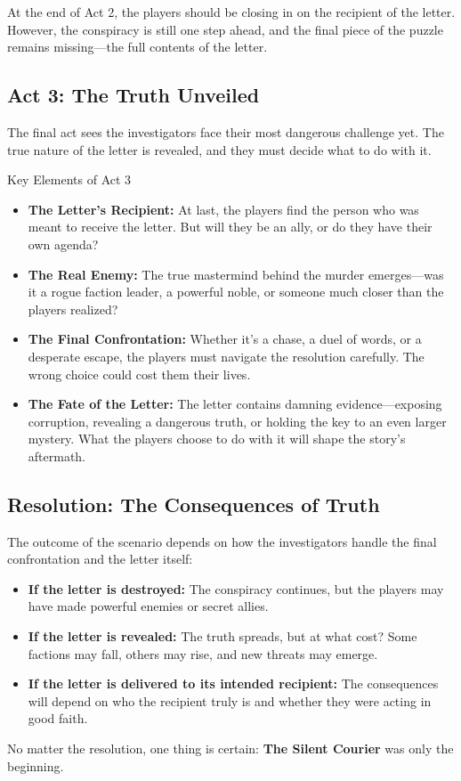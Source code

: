 \noindent
At the end of Act 2, the players should be closing in on the recipient of the letter. However, the conspiracy is still one step ahead, and the final piece of the puzzle remains missing—the full contents of the letter.

\subsection{Act 3: The Truth Unveiled}  
The final act sees the investigators face their most dangerous challenge yet. The true nature of the letter is revealed, and they must decide what to do with it.

\begin{Example}{Key Elements of Act 3}
    \begin{itemize}
        \item \textbf{The Letter’s Recipient:} At last, the players find the person who was meant to receive the letter. But will they be an ally, or do they have their own agenda?
        \item \textbf{The Real Enemy:} The true mastermind behind the murder emerges—was it a rogue faction leader, a powerful noble, or someone much closer than the players realized?
        \item \textbf{The Final Confrontation:} Whether it’s a chase, a duel of words, or a desperate escape, the players must navigate the resolution carefully. The wrong choice could cost them their lives.
        \item \textbf{The Fate of the Letter:} The letter contains damning evidence—exposing corruption, revealing a dangerous truth, or holding the key to an even larger mystery. What the players choose to do with it will shape the story’s aftermath.
    \end{itemize}
\end{Example}

\subsection{Resolution: The Consequences of Truth}  
The outcome of the scenario depends on how the investigators handle the final confrontation and the letter itself:

\begin{itemize}
    \item \textbf{If the letter is destroyed:} The conspiracy continues, but the players may have made powerful enemies or secret allies.
    \item \textbf{If the letter is revealed:} The truth spreads, but at what cost? Some factions may fall, others may rise, and new threats may emerge.
    \item \textbf{If the letter is delivered to its intended recipient:} The consequences will depend on who the recipient truly is and whether they were acting in good faith.
\end{itemize}

No matter the resolution, one thing is certain: \textbf{The Silent Courier} was only the beginning.